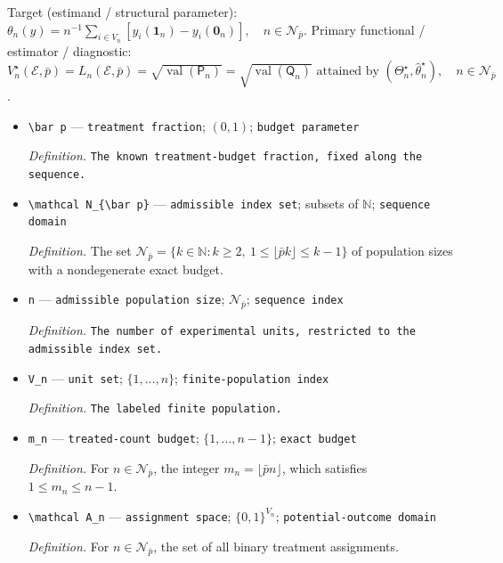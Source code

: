 \documentclass{article}
\begin{document}
Target (estimand / structural parameter): \(\theta_n(y)=n^{-1}\sum_{i\in V_n}[y_i(\mathbf 1_n)-y_i(\mathbf 0_n)],\quad n\in\mathcal N_{\bar p}\).
Primary functional / estimator / diagnostic: \(V_n^\star(\mathcal E,\bar p)=L_n(\mathcal E,\bar p)=\sqrt{\operatorname{val}(\mathsf P_n)}=\sqrt{\operatorname{val}(\mathsf Q_n)}\text{ attained by }(\Theta_n^\star,\widehat\theta_n^\star),\quad n\in\mathcal N_{\bar p}\).
\begin{itemize}
  \item \texttt{\textbackslash{}\allowbreak{}bar p} --- \texttt{treatment fraction}; \((0,1)\); \texttt{budget parameter}
  \par\smallskip\noindent\emph{Definition.} \texttt{The known treatment-\allowbreak{}budget fraction,\allowbreak{} fixed along the sequence.}
  \item \texttt{\textbackslash{}\allowbreak{}mathcal N\_\allowbreak{}\{\textbackslash{}\allowbreak{}bar p\}\allowbreak{}} --- \texttt{admissible index set}; subsets of \(\mathbb N\); \texttt{sequence domain}
  \par\smallskip\noindent\emph{Definition.} The set \(\mathcal N_{\bar p}=\{k\in\mathbb N:k\ge2,\ 1\le\lfloor\bar p k\rfloor\le k-1\}\) of population sizes with a nondegenerate exact budget.
  \item \texttt{n} --- \texttt{admissible population size}; \(\mathcal N_{\bar p}\); \texttt{sequence index}
  \par\smallskip\noindent\emph{Definition.} \texttt{The number of experimental units,\allowbreak{} restricted to the admissible index set.}
  \item \texttt{V\_\allowbreak{}n} --- \texttt{unit set}; \(\{1,\ldots,n\}\); \texttt{finite-\allowbreak{}population index}
  \par\smallskip\noindent\emph{Definition.} \texttt{The labeled finite population.}
  \item \texttt{m\_\allowbreak{}n} --- \texttt{treated-\allowbreak{}count budget}; \(\{1,\ldots,n-1\}\); \texttt{exact budget}
  \par\smallskip\noindent\emph{Definition.} For \(n\in\mathcal N_{\bar p}\), the integer \(m_n=\lfloor\bar p n\rfloor\), which satisfies \(1\le m_n\le n-1\).
  \item \texttt{\textbackslash{}\allowbreak{}mathcal A\_\allowbreak{}n} --- \texttt{assignment space}; \(\{0,1\}^{V_n}\); \texttt{potential-\allowbreak{}outcome domain}
  \par\smallskip\noindent\emph{Definition.} For \(n\in\mathcal N_{\bar p}\), the set of all binary treatment assignments.

\end{itemize}
\end{document}
